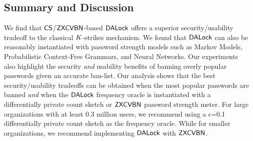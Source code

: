 \subsection{Summary and Discussion}\label{sec:experiment_summary}

We find that $\mathsf{CS}$/$\mathsf{ZXCVBN}$-based $\mathsf{DALock}$ offers a superior security/usability tradeoff to the classical $K$-strikes mechanism. We found that $\mathsf{DALock}$ can also be reasonably instantiated with password strength models such as Markov Models, Probabilistic Context-Free Grammars, and Neural Networks. Our experiments also highlight the security {\em and} usability benefits of banning overly popular passwords given an accurate ban-list. Our analysis shows that the best security/usability tradeoffs can be obtained when the most popular passwords are banned \textit{and} when the $\mathsf{DALock}$ frequency oracle is instantiated with a differentially private count sketch or $\mathsf{ZXCVBN}$ password strength meter. For large organizations with at least $0.3$ million users, we recommend using a $\epsilon$=0.1 differentially private count sketch as the frequency oracle. While for smaller organizations, we recommend implementing $\mathsf{DALock}$ with $\mathsf{ZXCVBN}$. 




